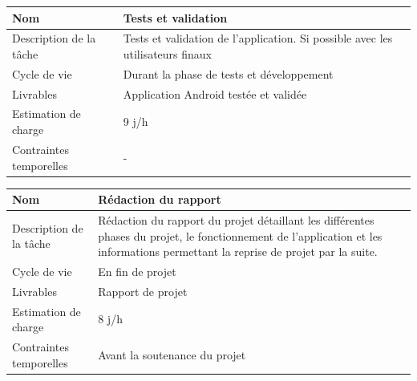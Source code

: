\documentclass[CDS,UTF8,final]{EPURapport}
\begin{document}
\begin{table}[h!]
\centering
\begin{tabular}{|p{4cm}|p{10cm}|}
\hline
Nom                     & Tests et validation                                                            \\ \hline
Description de la tâche & Tests et validation de l'application. Si possible avec les utilisateurs finaux \\ \hline
Cycle de vie            & Durant la phase de tests et développement                                      \\ \hline
Livrables               & Application Android testée et validée                                          \\ \hline
Estimation de charge    & 9 j/h                                                                          \\ \hline
Contraintes temporelles & - \\ \hline

\end{tabular}
\end{table}
\par

\begin{table}[h!]
\centering
\begin{tabular}{|p{4cm}|p{10cm}|}
\hline
Nom                     & Rédaction du rapport                                                                                                                                                             \\ \hline
Description de la tâche & Rédaction du rapport du projet détaillant les différentes phases du projet, le fonctionnement de l'application et les informations permettant la reprise de projet par la suite. \\ \hline
Cycle de vie            & En fin de projet                                                                                                                                                                 \\ \hline
Livrables               & Rapport de projet                                                                                                                                                                \\ \hline
Estimation de charge    & 8 j/h                                                                                                                                                                            \\ \hline
Contraintes temporelles & Avant la soutenance du projet                                                                                                                                                    \\ \hline
\end{tabular}
\end{table}
\par
\end{document}
